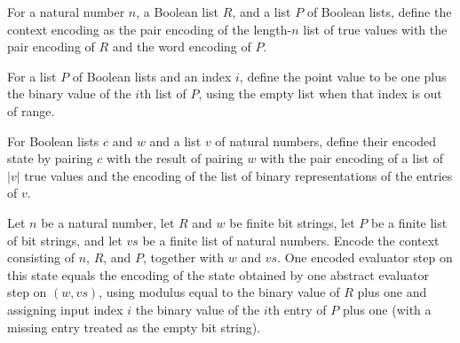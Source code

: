 \begin{definition}
\label{Randomized.PIT.ctxOf}
\leanok
{}
For a natural number $n$, a Boolean list $R$, and a list $P$ of Boolean lists, define
the context encoding as the pair encoding of the length-$n$ list of true values with the
pair encoding of $R$ and the word encoding of $P$.
\end{definition}

\begin{definition}
\label{Randomized.PIT.ptVal}
\leanok
{}
For a list $P$ of Boolean lists and an index $i$, define the point value to be one plus
the binary value of the $i$th list of $P$, using the empty list when that index is out
of range.
\end{definition}

\begin{definition}
\label{Randomized.PIT.encState}
\leanok
{}
For Boolean lists $c$ and $w$ and a list $v$ of natural numbers, define their encoded
state by pairing $c$ with the result of pairing $w$ with the pair encoding of a list of
$|v|$ true values and the encoding of the list of binary representations of the entries
of $v$.
\end{definition}

\begin{theorem}
\label{Randomized.PIT.gStep_encState}
\leanok
{}
Let $n$ be a natural number, let $R$ and $w$ be finite bit strings, let $P$ be a finite
list of bit strings, and let $vs$ be a finite list of natural numbers. Encode the
context consisting of $n$, $R$, and $P$, together with $w$ and $vs$. One encoded
evaluator step on this state equals the encoding of the state obtained by one abstract
evaluator step on $(w,vs)$, using modulus equal to the binary value of $R$ plus one and
assigning input index $i$ the binary value of the $i$th entry of $P$ plus one (with a
missing entry treated as the empty bit string).
\end{theorem}

